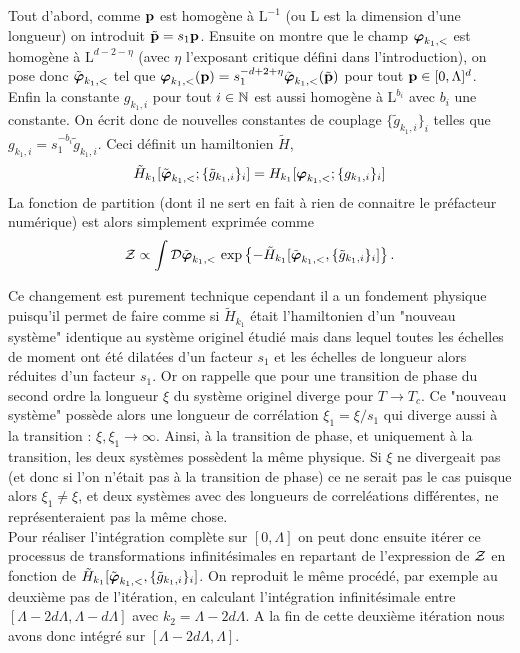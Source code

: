 \documentclass[10.5pt]{article}
\begin{document}
\begin{multicols}{2}
 Tout d'abord, comme ${\bf p}$ est homogène à $\text{L}^{-1}$ (ou L est la dimension d'une longueur) on introduit $\tilde{{\bf p}} = s_1 {\bf p}$. Ensuite on montre que le champ $\boldsymbol{ \varphi}_{k_1, <}$ est homogène à $\text{L}^{d-2-\eta}$ (avec $\eta$ l'exposant critique défini dans l'introduction), on pose donc $\tilde{\boldsymbol{ \varphi}}_{k_1, <}$ tel que $\boldsymbol{ \varphi}_{k_1, <}({\bf p}) = s_1^{-d+2+\eta} \tilde{\boldsymbol{ \varphi}}_{k_1, <}(\tilde{{\bf p}})$ pour tout ${\bf p} \in [0, \Lambda]^d$. Enfin la constante $g_{k_1, i}$ pour tout $i\in \mathbb{N}$ est aussi homogène à $\text{L}^{b_i}$ avec $b_i$ une constante. On écrit donc de nouvelles constantes de couplage $\{\tilde{g}_{k_1, i}\}_i$ telles que $g_{k_1, i} = s_1^{-b_i} \tilde{g}_{k_1, i}$. Ceci définit un hamiltonien $\tilde{H}$,
 \begin{equation}
 	\tilde{H}_{k_1}[\tilde{\boldsymbol{ \varphi}}_{k_1,<}; \{\tilde{g}_{k_1, i}\}_i ] = H_{k_1}[\boldsymbol{ \varphi}_{k_1,<}; \{g_{k_1,i}\}_i]
 \end{equation}
La fonction de partition (dont il ne sert en fait à rien de connaitre le préfacteur numérique) est alors simplement exprimée comme 
\begin{equation}
\mathcal{Z} \propto \int \mathcal{D} \tilde{\boldsymbol{ \varphi}}_{k_1,<} \, \exp\left\{- \tilde{H}_{k_1}[\tilde{\boldsymbol{ \varphi}}_{k_1,<}, \{\tilde{g}_{k_1, i}\}_i ] \right\}. 
\end{equation} 


Ce changement est purement technique cependant il a un fondement physique puisqu'il permet de faire comme si $\tilde{H}_{k_1}$ était l'hamiltonien d'un "nouveau système" identique au système originel étudié mais dans lequel toutes les échelles de moment ont été dilatées d'un facteur $s_1$ et les échelles de longueur alors réduites d'un facteur $s_1$. Or on rappelle que pour une transition de phase du second ordre la longueur $\xi$ du système originel diverge pour $T \to T_c$. Ce "nouveau système" possède alors une longueur de corrélation $\xi_1 = \xi/s_1$ qui diverge aussi à la transition : $\xi, \xi_1 \to \infty$. Ainsi, à la transition de phase, et uniquement à la transition, les deux systèmes possèdent la même physique. Si $\xi$ ne divergeait pas (et donc si l'on n'était pas à la transition de phase) ce ne serait pas le cas puisque alors $\xi_1 \neq \xi$, et deux systèmes avec des longueurs de correléations différentes, ne représenteraient pas la même chose. \\

 Pour réaliser l'intégration complète sur $[0, \Lambda]$ on peut donc ensuite itérer ce processus de transformations infinitésimales en repartant de l'expression de $\mathcal{Z}$ en fonction de $\tilde{H}_{k_1}[\tilde{\boldsymbol{ \varphi}}_{k_1,<}, \{\tilde{g}_{k_1, i}\}_i ]$. On reproduit le même procédé, par exemple au deuxième pas de l'itération, en calculant l'intégration infinitésimale entre $[\Lambda - 2d\Lambda, \Lambda - d\Lambda]$ avec $k_2 = \Lambda - 2d\Lambda$. A la fin de cette deuxième itération nous avons donc intégré sur $[\Lambda - 2d\Lambda, \Lambda]$.  \\
 

\end{multicols}
\end{document}
